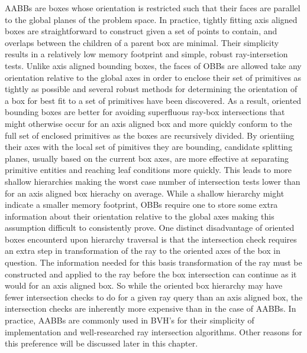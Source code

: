 \documentclass[12pt, a4paper]{article}
\begin{document}
AABBs are boxes whose orientation is restricted such that their faces are parallel to the global planes of the problem space. In practice, tightly fitting axis aligned boxes are straightforward to construct given a set of points to contain, and overlaps between the children of a parent box are minimal. Their simplicity results in a relatively low memory footprint and simple, robust ray-intersetion tests. Unlike axis aligned bounding boxes, the faces of OBBs are allowed take any orientation relative to the global axes in order to enclose their set of primitives as tightly as possible and several robust methods for determining the orientation of a box for best fit to a set of primitives have been discovered.\cite{Gottschalk_1996,ORourke_1985} As a result, oriented bounding boxes are better for avoiding superfluous ray-box intersections that might otherwise occur for an axis aligned box and more quickly conform to the full set of enclosed primitives as the boxes are recursively divided. By orientiing their axes with the local set of pimitives they are bounding, candidate splitting planes, usually based on the current box axes, are more effective at separating primitive entities and reaching leaf conditions more quickly. This leads to more shallow hierarchies making the worst case number of intersection tests lower than for an axis aligned box hierachy on average. While a shallow hierarchy might indicate a smaller memory footprint, OBBs require one to store some extra information about their orientation relative to the global axes making this assumption difficult to consistently prove. One distinct disadvantage of oriented boxes encounterd upon hierarchy traversal is that the intersection check requires an extra step in transformation of the ray to the oriented axes of the box in question. The information needed for this basis transformation of the ray must be constructed and applied to the ray before the box intersection can continue as it would for an axis aligned box. So while the oriented box hierarchy may have fewer intersection checks to do for a given ray query than an axis aligned box, the intersection checks are inherently more expensive than in the case of AABBs. In practice, AABBs are commonly used in BVH's for their simplicity of implementation and well-researched ray intersection algorithms. Other reasons for this preference will be discussed later in this chapter.
\end{document}

